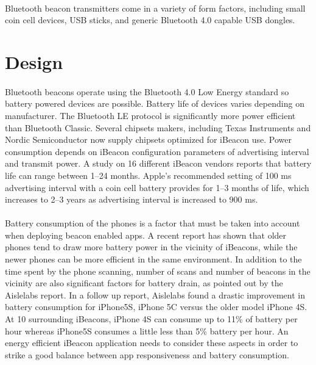 \documentclass[a4paper,12pt]{report}
\begin{document}
\paragraph{}Bluetooth beacon transmitters come in a variety of form factors, including small coin cell devices, USB sticks, and generic Bluetooth 4.0 capable USB dongles.
\section{Design}
\paragraph{}Bluetooth beacons operate using the Bluetooth 4.0 Low Energy standard so battery powered devices are possible. Battery life of devices varies depending on manufacturer. The Bluetooth LE protocol is significantly more power efficient than Bluetooth Classic. Several chipsets makers, including Texas Instruments and Nordic Semiconductor now supply chipsets optimized for iBeacon use. Power consumption depends on iBeacon configuration parameters of advertising interval and transmit power. A study on 16 different iBeacon vendors reports that battery life can range between 1–24 months. Apple's recommended setting of 100 ms advertising interval with a coin cell battery provides for 1–3 months of life, which increases to 2–3 years as advertising interval is increased to 900 ms. 
\paragraph{}Battery consumption of the phones is a factor that must be taken into account when deploying beacon enabled apps. A recent report has shown that older phones tend to draw more battery power in the vicinity of iBeacons, while the newer phones can be more efficient in the same environment. In addition to the time spent by the phone scanning, number of scans and number of beacons in the vicinity are also significant factors for battery drain, as pointed out by the Aislelabs report. In a follow up report, Aislelabs found a drastic improvement in battery consumption for iPhone5S, iPhone 5C versus the older model iPhone 4S. At 10 surrounding iBeacons, iPhone 4S can consume up to 11\% of battery per hour whereas iPhone5S consumes a little less than 5\% battery per hour. An energy efficient iBeacon application needs to consider these aspects in order to strike a good balance between app responsiveness and battery consumption.
\end{document}
